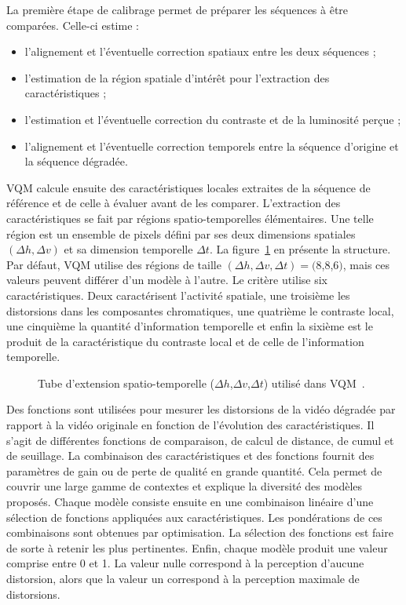 La première étape de calibrage permet de préparer les séquences à être comparées. Celle-ci estime :
\begin{itemize}
\item l'alignement et l'éventuelle correction spatiaux entre les deux séquences ;
\item l'estimation de la région spatiale d'intérêt pour l'extraction des caractéristiques ;
\item l'estimation et l'éventuelle correction du contraste et de la luminosité perçue ;
\item l'alignement et l'éventuelle correction temporels entre la séquence d'origine et la séquence dégradée.
\end{itemize}

VQM calcule ensuite des caractéristiques locales extraites de la séquence de référence et de celle à évaluer avant de les comparer. L'extraction des caractéristiques se fait par régions spatio-temporelles élémentaires. Une telle région est un ensemble de pixels défini par ses deux dimensions spatiales $(\Delta h,\Delta v)$ et sa dimension temporelle $\Delta t$. La figure~\ref{fig:vqmTube} en présente la structure. Par défaut, VQM utilise des régions de taille $(\Delta h,\Delta v,\Delta t)=($8,8,6$)$, mais ces valeurs peuvent différer d'un modèle à l'autre. Le critère utilise six caractéristiques. Deux caractérisent l'activité spatiale, une troisième les distorsions dans les composantes chromatiques, une quatrième le contraste local, une cinquième la quantité d'information temporelle et enfin la sixième est le produit de la caractéristique du contraste local et de celle de l'information temporelle.

\begin{figure}[htbp]
	\centering
	
	\caption{Tube d'extension spatio-temporelle ($\Delta h$,$\Delta v$,$\Delta t$) utilisé dans VQM~\cite{wolf-vqmtech}.}
	\label{fig:vqmTube}
\end{figure}

Des fonctions sont utilisées pour mesurer les distorsions de la vidéo dégradée par rapport à la vidéo originale en fonction de l'évolution des caractéristiques. Il s'agit de différentes fonctions de comparaison, de calcul de distance, de cumul et de seuillage. La combinaison des caractéristiques et des fonctions fournit des paramètres de gain ou de perte de qualité en grande quantité. Cela permet de couvrir une large gamme de contextes et explique la diversité des modèles proposés. Chaque modèle consiste ensuite en une combinaison linéaire d'une sélection de fonctions appliquées aux caractéristiques. Les pondérations de ces combinaisons sont obtenues par optimisation. La sélection des fonctions est faire de sorte à retenir les plus pertinentes. Enfin, chaque modèle produit une valeur comprise entre 0 et 1. La valeur nulle correspond à la perception d'aucune distorsion, alors que la valeur un correspond à la perception maximale de distorsions.


